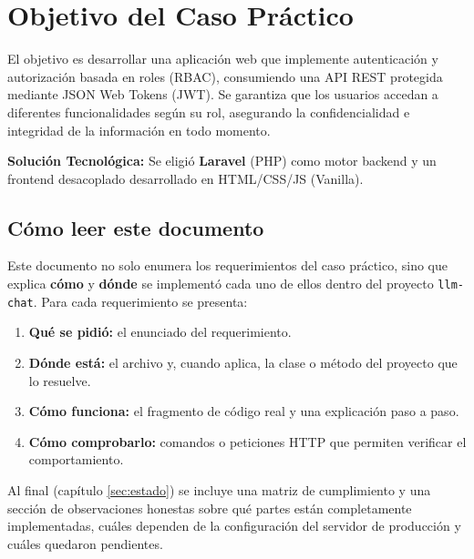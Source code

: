 \section{Objetivo del Caso Práctico}
El objetivo es desarrollar una aplicación web que implemente autenticación y autorización basada en roles (RBAC), consumiendo una API REST protegida mediante JSON Web Tokens (JWT). Se garantiza que los usuarios accedan a diferentes funcionalidades según su rol, asegurando la confidencialidad e integridad de la información en todo momento.

\textbf{Solución Tecnológica:} Se eligió \textbf{Laravel} (PHP) como motor backend y un frontend desacoplado desarrollado en HTML/CSS/JS (Vanilla).

\subsection{Cómo leer este documento}
Este documento no solo enumera los requerimientos del caso práctico, sino que explica \textbf{cómo} y \textbf{dónde} se implementó cada uno de ellos dentro del proyecto \texttt{llm-chat}. Para cada requerimiento se presenta:
\begin{enumerate}
    \item \textbf{Qué se pidió:} el enunciado del requerimiento.
    \item \textbf{Dónde está:} el archivo y, cuando aplica, la clase o método del proyecto que lo resuelve.
    \item \textbf{Cómo funciona:} el fragmento de código real y una explicación paso a paso.
    \item \textbf{Cómo comprobarlo:} comandos o peticiones HTTP que permiten verificar el comportamiento.
\end{enumerate}

Al final (capítulo \ref{sec:estado}) se incluye una matriz de cumplimiento y una sección de observaciones honestas sobre qué partes están completamente implementadas, cuáles dependen de la configuración del servidor de producción y cuáles quedaron pendientes.

